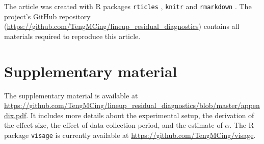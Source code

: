 \documentclass[]{interact}
\theoremstyle{plain}%
\theoremstyle{definition}
\theoremstyle{remark}
\begin{document}
The article was created with R packages \texttt{rticles}
\citep{rticles}, \texttt{knitr} \citep{knitr} and \texttt{rmarkdown}
\citep{rmarkdown}. The project's GitHub repository
(\url{https://github.com/TengMCing/lineup_residual_diagnostics})
contains all materials required to reproduce this article.

\hypertarget{supplementary-material}{%
\section*{Supplementary material}\label{supplementary-material}}

The supplementary material is available at
\url{https://github.com/TengMCing/lineup_residual_diagnostics/blob/master/appendix.pdf}.
It includes more details about the experimental setup, the derivation of
the effect size, the effect of data collection period, and the estimate
of \(\alpha\). The R package \texttt{visage} is currently available at
\url{https://github.com/TengMCing/visage}.



\end{document}
